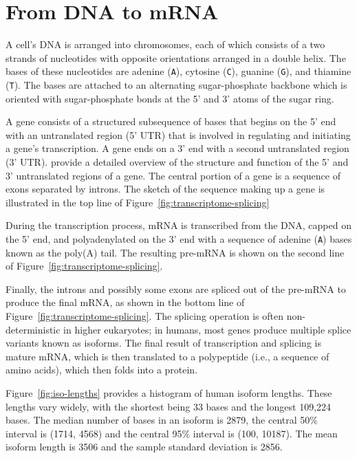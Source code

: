 \documentclass[11pt]{report}
\newcommand{\mybase}[1]{\texttt{#1}\xspace}
\newcommand{\baseA}{\mybase{A}}
\newcommand{\baseC}{\mybase{C}}
\newcommand{\baseG}{\mybase{G}}
\newcommand{\baseT}{\mybase{T}}
\begin{document}
\section{From DNA to mRNA}

A cell's DNA is arranged into chromosomes, each of which consists of a
two strands of nucleotides with opposite orientations arranged in a
double helix. The bases of these nucleotides are adenine (\baseA),
cytosine (\baseC), guanine (\baseG), and thiamine (\baseT). The bases
are attached to an alternating sugar-phosphate backbone which is
oriented with sugar-phosphate bonds at the 5' and 3' atoms of the
sugar ring.

A gene consists of a structured subsequence of bases that begins on
the 5' end with an untranslated region (5' UTR) that is involved in
regulating and initiating a gene's transcription. A gene ends on a 3'
end with a second untranslated region (3' UTR).
\citep{mignone2002untranslated} provide a detailed overview of the
structure and function of the 5' and 3' untranslated regions of a
gene. The central portion of a gene is a sequence of exons separated
by introns. The sketch of the sequence making up a gene is illustrated
in the top line of Figure~\ref{fig:transcriptome-splicing}

During the transcription process, mRNA is transcribed from the DNA,
capped on the 5' end, and polyadenylated on the 3' end with a sequence
of adenine (\baseA) bases known as the poly(A) tail. The resulting
pre-mRNA is shown on the second line of
Figure~\ref{fig:transcriptome-splicing}.

Finally, the introns and possibly some exons are spliced out of the
pre-mRNA to produce the final mRNA, as shown in the bottom line of
Figure~\ref{fig:transcriptome-splicing}. The splicing operation is
often non-deterministic in higher eukaryotes; in humans, most genes
produce multiple splice variants known as isoforms. The final result
of transcription and splicing is mature mRNA, which is then translated
to a polypeptide (i.e., a sequence of amino acids), which then folds
into a protein.

Figure~\ref{fig:iso-lengths} provides a histogram of human isoform
lengths. These lengths vary widely, with the shortest being 33 bases
and the longest 109,224 bases. The median number of bases in an
isoform is 2879, the central 50\% interval is (1714, 4568) and the
central 95\% interval is (100, 10187). The mean isoform length is 3506
and the sample standard deviation is 2856.
\end{document}
